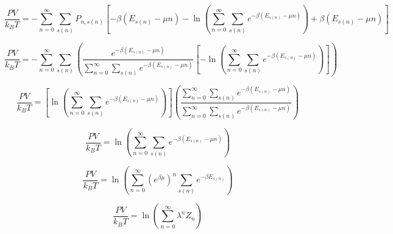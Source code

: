 \documentclass[double,12pt]{beavtex}
\begin{document}
\begin{equation}\frac{PV}{k_BT}=-\sum_{n=0}^\infty\sum_{s(n)}P_{n,s(n)}\left[-\beta(E_{s(n)}-\mu{n})-\ln{\left(\sum_{n=0}^\infty\sum_{s(n)}e^{-\beta(E_{s(n)}-\mu{n})}\right)}+\beta(E_{s(n)}-\mu{n})\right]\end{equation}

\begin{equation}\frac{PV}{k_BT}=-\sum_{n=0}^\infty\sum_{s(n)}\left(\frac{e^{-\beta(E_{s(n)}-\mu{n})}}{\sum_{n=0}^\infty\sum_{s(n)}e^{-\beta(E_{s(n)}-\mu{n})}} \left[-\ln{\left(\sum_{n=0}^\infty\sum_{s(n)}e^{-\beta(E_{s(n)}-\mu{n})}\right)}\right]\right)\end{equation}

\begin{equation}\frac{PV}{k_BT}=\left[\ln{\left(\sum_{n=0}^\infty\sum_{s(n)}e^{-\beta(E_{s(n)}-\mu{n})}\right)}\right]\left(\frac{\sum_{n=0}^\infty\sum_{s(n)}e^{-\beta(E_{s(n)}-\mu{n})}}{\sum_{n=0}^\infty\sum_{s(n)}e^{-\beta(E_{s(n)}-\mu{n})}}\right) \end{equation}

\begin{equation}\frac{PV}{k_BT}=\ln{\left(\sum_{n=0}^\infty\sum_{s(n)}e^{-\beta(E_{s(n)}-\mu{n})}\right)} \end{equation}

\begin{equation}\frac{PV}{k_BT}=\ln{\left(\sum_{n=0}^\infty \left(e^{\beta\mu}\right)^n\sum_{s(n)}e^{-\beta{E}_{s(n)}}\right)} \end{equation}

\begin{equation}\frac{PV}{k_BT}=\ln{\left(\sum_{n=0}^\infty \lambda^nZ_n\right)} \end{equation}
\end{document}
